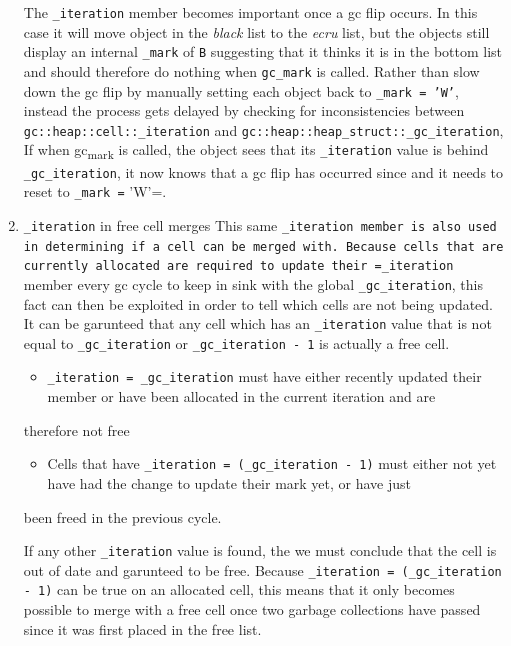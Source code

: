 \documentclass[11pt]{article}
\begin{document}
\begin{enumerate}
The \texttt{\_iteration} member becomes important once a gc flip occurs. In this case it will move object in the \emph{black} list to
the \emph{ecru} list, but the objects still display an internal \texttt{\_mark} of \texttt{B} suggesting that it thinks it is
in the bottom list and should therefore do nothing when \texttt{gc\_mark} is called.
Rather than slow down the gc flip by manually setting each object back to \texttt{\_mark = 'W'}, instead the process gets delayed by 
checking for inconsistencies between \texttt{gc::heap::cell::\_iteration} and \texttt{gc::heap::heap\_struct::\_gc\_iteration}, If when
gc\textsubscript{mark} is called, the object sees that its \texttt{\_iteration} value is behind \texttt{\_gc\_iteration}, it now knows that a gc flip has occurred since
and it needs to reset to \texttt{\_mark =} 'W'=.
\item \texttt{\_iteration} in free cell merges
\label{sec:org1ecec9e}
This same \texttt{\_iteration member is also used in determining if a cell can be merged with. Because cells that are currently allocated
are required to update their =\_iteration} member every gc cycle to keep in sink with the global \texttt{\_gc\_iteration},
this fact can then be exploited in order to tell which cells are not being updated.
It can be garunteed that any cell which has an \texttt{\_iteration} value that is not equal to \texttt{\_gc\_iteration} or
\texttt{\_gc\_iteration - 1} is actually a free cell.
\begin{itemize}
\item \texttt{\_iteration = \_gc\_iteration} must have either recently updated their member or have been allocated in the current iteration and are
\end{itemize}
therefore not free
\begin{itemize}
\item Cells that have \texttt{\_iteration = (\_gc\_iteration - 1)} must either not yet have had the change to update their mark yet, or have just
\end{itemize}
been freed in the previous cycle.

If any other \texttt{\_iteration} value is found, the we must conclude that the cell is out of date and garunteed to be free.
Because \texttt{\_iteration = (\_gc\_iteration - 1)} can be true on an allocated cell, this means that it only becomes possible to merge with
a free cell once two garbage collections have passed since it was first placed in the free list.
\end{enumerate}
\end{document}
